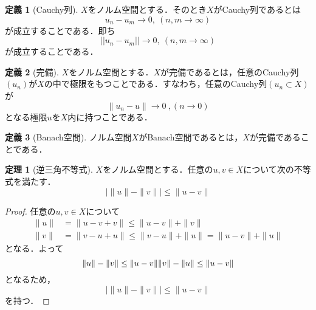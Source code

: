 \documentclass[11pt,a4paper,titlepage]{jsreport}
\theoremstyle{definition}
\newtheorem{dfn}{定義}
\newtheorem{thm}{定理}
\begin{document}
\begin{dfn}[Cauchy列]
  \label{dfn:cauchy}
  $X$をノルム空間とする．そのとき$X$がCauchy列であるとは
  \begin{equation*}
    u_n-u_m\rightarrow 0, \ \left(n,m\rightarrow\infty \right)
  \end{equation*}
  が成立することである．即ち
  \begin{equation*}
    ||u_n-u_m||\rightarrow 0, \ \left(n,m\rightarrow \infty\right)
  \end{equation*}
  が成立することである．
\end{dfn}

\begin{dfn}[完備]
  \label{dfn:完備}
  $X$をノルム空間とする．$X$が完備であるとは，任意のCauchy列$(u_n)$が$X$の中で極限をもつことである．すなわち，任意のCauchy列$(u_n\subset X)$が
  \begin{equation*}
    \|u_n-u\|\rightarrow 0\ ,\left(n\rightarrow 0\right)
  \end{equation*}
  となる極限$u$を$X$内に持つことである．
\end{dfn}

\begin{dfn}[Banach空間]
  ノルム空間$X$がBanach空間であるとは，$X$が完備であることである．
\end{dfn}

\begin{thm}[逆三角不等式]
  \label{thm1}
  $X$をノルム空間とする．任意の$u,v\in X$について次の不等式を満たす．
  \begin{equation*}
    |\|u\|-\|v\||\leq\|u-v\|
  \end{equation*}
\end{thm}

\begin{proof}
  任意の$u,v\in X$について
  \begin{align*}
    \|u\| & =\|u-v+v\|\leq\|u-v\|+\|v\|               \\
    \|v\| & =\|v-u+u\|\leq\|v-u\|+\|u\|=\|u-v\|+\|u\|
  \end{align*}
  となる．よって
  \begin{equation*}
    \|u\|-\|v\|\leq\|u-v\| \\
    \|v\|-\|u\|\leq\|u-v\|
  \end{equation*}
  となるため，
  \begin{equation*}
    |\|u\|-\|v\||\leq\|u-v\|
  \end{equation*}
  を持つ．
\end{proof}
\end{document}
